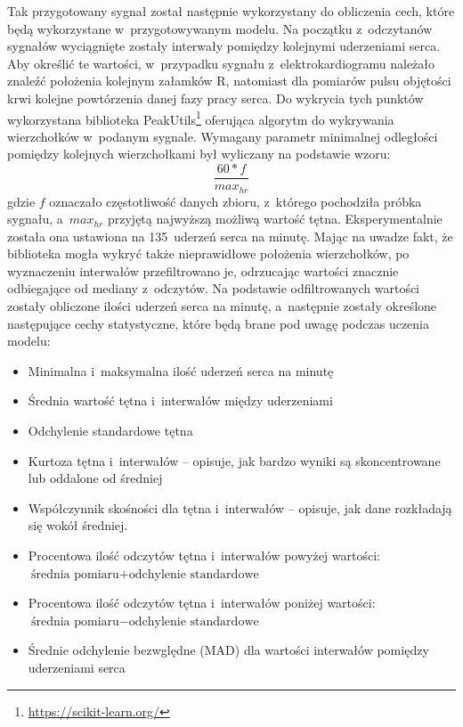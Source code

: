 Tak przygotowany sygnał został następnie wykorzystany do obliczenia cech, które będą wykorzystane w~przygotowywanym modelu. Na początku z~odczytanów sygnałów wyciągnięte zostały interwały pomiędzy kolejnymi uderzeniami serca. Aby określić te wartości, w~przypadku sygnału z~elektrokardiogramu należało znaleźć położenia kolejnym załamków R, natomiast dla pomiarów pulsu objętości krwi kolejne powtórzenia danej fazy pracy serca. Do wykrycia tych punktów wykorzystana biblioteka PeakUtils\footnote{\url{https://scikit-learn.org/}} oferująca algorytm do wykrywania wierzchołków w~podanym sygnale. Wymagany parametr minimalnej odległości pomiędzy kolejnych wierzchołkami był wyliczany na podstawie wzoru:
$$
\frac{60*f}{max_{hr}}
$$
gdzie $f$ oznaczało częstotliwość danych zbioru, z~którego pochodziła próbka sygnału, a~$max_{hr}$ przyjętą najwyższą możliwą wartość tętna. Eksperymentalnie została ona ustawiona na 135~uderzeń serca na minutę. Mając na uwadze fakt, że biblioteka mogła wykryć także nieprawidłowe położenia wierzchołków, po wyznaczeniu interwałów przefiltrowano je, odrzucając wartości znacznie odbiegające od mediany z~odczytów. Na podstawie odfiltrowanych wartości zostały obliczone ilości uderzeń serca na minutę, a~następnie zostały określone następujące cechy statystyczne, które będą brane pod uwagę podczas uczenia modelu:
\begin{itemize}
	\item Minimalna i~maksymalna ilość uderzeń serca na minutę
	\item Średnia wartość tętna i~interwałów między uderzeniami
	\item Odchylenie standardowe tętna
	\item Kurtoza tętna i~interwałów -- opisuje, jak bardzo wyniki są skoncentrowane lub oddalone od średniej
	\item Współczynnik skośności dla tętna i~interwałów -- opisuje, jak dane rozkładają się wokół średniej.
	\item Procentowa ilość odczytów tętna i~interwałów powyżej wartości: $\text{średnia pomiaru} + \text{odchylenie standardowe}$
	\item Procentowa ilość odczytów  tętna i~interwałów poniżej wartości: $\text{średnia pomiaru} - \text{odchylenie standardowe}$
	\item Średnie odchylenie bezwględne (MAD) dla wartości interwałów pomiędzy uderzeniami serca
\end{itemize}

